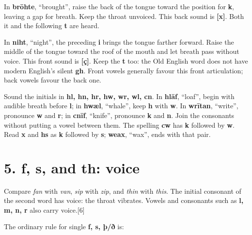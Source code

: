 In \textbf{brōhte}, “brought”, raise the back of the tongue toward the position for \textbf{k}, leaving a gap for breath. Keep the throat unvoiced. This back sound is \textbf{[x]}. Both it and the following \textbf{t} are heard.

In \textbf{niht}, “night”, the preceding \textbf{i} brings the tongue farther forward. Raise the middle of the tongue toward the roof of the mouth and let breath pass without voice. This front sound is \textbf{[ç]}. Keep the \textbf{t} too: the Old English word does not have modern English's silent \textbf{gh}. Front vowels generally favour this front articulation; back vowels favour the back one.

Sound the initials in \textbf{hl, hn, hr, hw, wr, wl, cn}. In \textbf{hlāf}, “loaf”, begin with audible breath before \textbf{l}; in \textbf{hwæl}, “whale”, keep \textbf{h} with \textbf{w}. In \textbf{wrītan}, “write”, pronounce \textbf{w} and \textbf{r}; in \textbf{cnīf}, “knife”, pronounce \textbf{k} and \textbf{n}. Join the consonants without putting a vowel between them. The spelling \textbf{cw} has \textbf{k} followed by \textbf{w}. Read \textbf{x} and \textbf{hs} as \textbf{k} followed by \textbf{s}; \textbf{weax}, “wax”, ends with that pair.

\section*{5. f, s, and th: voice}

Compare \emph{fan} with \emph{van}, \emph{sip} with \emph{zip}, and \emph{thin} with \emph{this}. The initial consonant of the second word has voice: the throat vibrates. Vowels and consonants such as \textbf{l, m, n, r} also carry voice.[6]

The ordinary rule for single \textbf{f, s, þ/\allowbreak{}ð} is:

